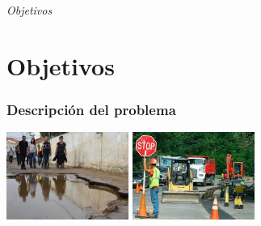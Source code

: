 \documentclass{beamer}
\begin{document}
\section*{}
\begin{frame}{}
  \centering \Huge
  \emph{Objetivos}
\end{frame}

\section{Objetivos}
\begin{frame}
	\frametitle{Descripción del problema}
	\begin{center}
		\includegraphics[width=0.3\textwidth]{figs/dana.jpg} \hspace{0.5cm}
		\includegraphics[width=0.3\textwidth]{figs/seguridad.jpg}
	\end{center}
	
	\vspace{0.5cm}  %
	
	\begin{center}
	

\end{center}
\end{frame}
\end{document}

